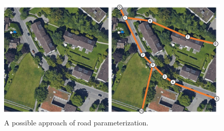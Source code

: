 \begin{figure}[!h]
	\centering
	\includegraphics[width=\figfi\textwidth]{5-04.pdf}
    \caption[A possible approach of road parameterization]{A possible approach of road parameterization.}
	\label{fig:pararoad}
\end{figure}